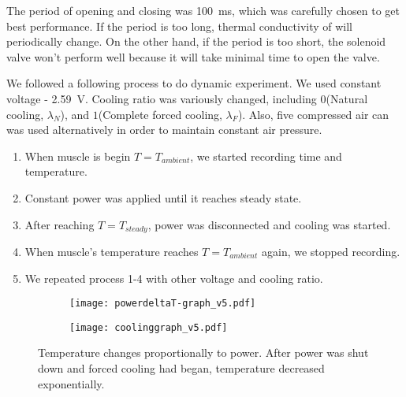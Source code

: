 The period of opening and closing was \SI{100}{\milli\second}, which was carefully chosen to get best performance. If the period is too long, thermal conductivity of \scp will periodically change. On the other hand, if the period is too short, the solenoid valve won't perform well because it will take minimal time to open the valve. 

We followed a following process to do dynamic experiment. We used constant voltage - \SI{2.59}{\volt}. Cooling ratio was variously changed, including $0$(Natural cooling, $\lambda_{N}$), and $1$(Complete forced cooling, $\lambda_{F}$). Also, five compressed air can was used alternatively in order to maintain constant air pressure.
\begin{enumerate}
\item When muscle is begin $T=T_{ambient}$, we started recording time and temperature.
\item Constant power was applied until it reaches steady state.
\item After reaching $T=T_{steady}$, power was disconnected and cooling was started. 
\item When muscle's temperature reaches $T=T_{ambient}$ again, we stopped recording. 
\item We repeated process 1-4 with other voltage and cooling ratio.
\end{enumerate}


\begin{figure}[t]
	\centering
	\begin{subfigure}[t]{0.45\linewidth}
		\centering\texttt{[image: powerdeltaT-graph\_v5.pdf]}
		\caption{\label{powerdeltaT}}
	\end{subfigure}%
	\begin{subfigure}[t]{0.45\linewidth}
		\centering\texttt{[image: coolinggraph\_v5.pdf]}
		\caption{\label{coolinggraph}}
	\end{subfigure}
	\caption[Results of dynamic experiment]{ Temperature changes proportionally to power.  After power was shut down and forced cooling had began, temperature decreased exponentially.}
	\label{result_dynamic}
\end{figure}

